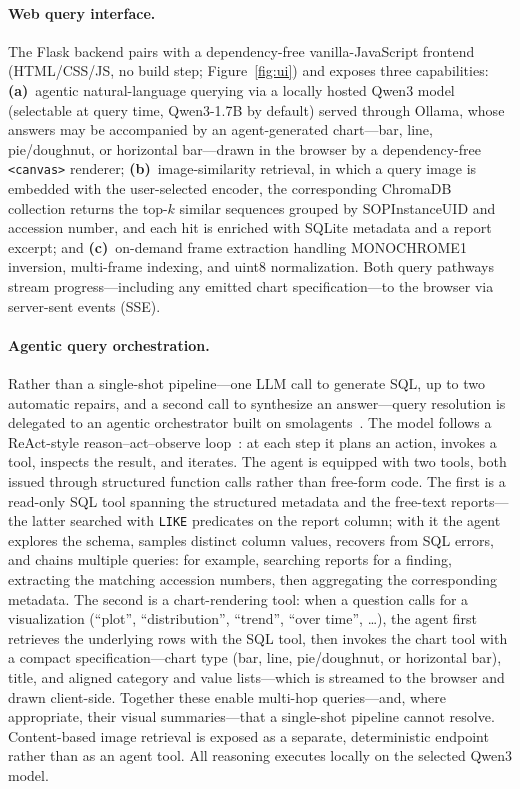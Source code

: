 \documentclass[11pt]{article}
\begin{document}
\paragraph{Web query interface.}
The Flask backend pairs with a dependency-free vanilla-JavaScript frontend
(HTML/CSS/JS, no build step; Figure~\ref{fig:ui}) and exposes three
capabilities: \textbf{(a)}~agentic natural-language querying via a locally hosted
Qwen3 model~\cite{yang2025qwen3} (selectable at query time, Qwen3-1.7B by
default) served through Ollama, whose answers may be accompanied by an
agent-generated chart---bar, line, pie/doughnut, or horizontal bar---drawn in
the browser by a dependency-free \texttt{<canvas>} renderer;
\textbf{(b)}~image-similarity retrieval, in which
a query image is embedded with the user-selected encoder, the corresponding
ChromaDB collection returns the top-$k$ similar sequences grouped by
SOPInstanceUID and accession number, and each hit is enriched with SQLite
metadata and a report excerpt; and \textbf{(c)}~on-demand frame extraction
handling MONOCHROME1 inversion, multi-frame indexing, and uint8 normalization.
Both query pathways stream progress---including any emitted chart
specification---to the browser via server-sent events (SSE).

\paragraph{Agentic query orchestration.}
Rather than a single-shot pipeline---one LLM call to generate SQL, up to two
automatic repairs, and a second call to synthesize an answer---query resolution
is delegated to an agentic orchestrator built on
smolagents~\cite{huggingface2025smolagents}. The model
follows a ReAct-style reason--act--observe loop~\cite{yao2023react}: at each
step it plans an action, invokes a tool, inspects the result, and iterates. The
agent is equipped with two tools, both issued through structured function calls
rather than free-form code. The first is a read-only SQL tool spanning the
structured metadata and the free-text reports---the latter searched with
\texttt{LIKE} predicates on the report column; with it the agent explores the
schema, samples distinct column values, recovers from SQL errors, and chains
multiple queries: for example, searching reports for a finding, extracting the
matching accession numbers, then aggregating the corresponding metadata. The
second is a chart-rendering tool: when a question calls for a visualization
(``plot'', ``distribution'', ``trend'', ``over time'', \ldots), the agent first
retrieves the underlying rows with the SQL tool, then invokes the chart tool
with a compact specification---chart type (bar, line, pie/doughnut, or
horizontal bar), title, and aligned category and value lists---which is streamed
to the browser and drawn client-side. Together these enable multi-hop
queries---and, where appropriate, their visual summaries---that a single-shot
pipeline cannot resolve. Content-based image retrieval is exposed as a
separate, deterministic endpoint rather than as an agent tool. All reasoning
executes locally on the selected Qwen3 model.
\end{document}
